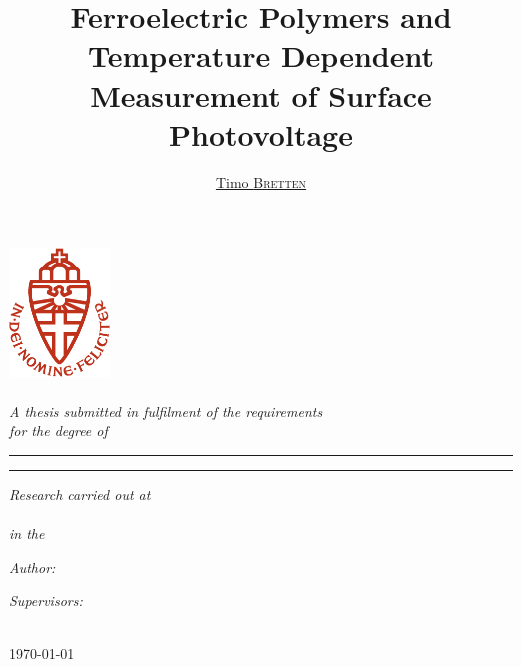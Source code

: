 \begin{titlepage}

\title{Ferroelectric Polymers and Temperature Dependent Measurement of Surface Photovoltage}
\author{\href{mailto:t.bretten@gmail.com}{Timo \textsc{Bretten}}}


\begin{center}
\includegraphics[width=0.2\textwidth]{../figs/logos/LogoRed}~\\[1cm]
\textsc{\LARGE \univname}\\[1.5cm]
\textit{\large A thesis submitted in fulfilment of the requirements\\ for the degree of \degreename}\\[0.5cm]

\hrule
\bigskip
{\huge \bfseries \ttitle \bigskip}
\hrule
\bigskip
\noindent
\textit{\large Research carried out at \\ \deptname{} \\ in the\\ \groupname \large }
\bigskip
\noindent

\begin{minipage}[t]{0.4\textwidth}
\begin{flushleft} \large
\emph{Author:}\\
\authorname
\end{flushleft}
\end{minipage}%
\begin{minipage}[t]{0.4\textwidth}
\begin{flushright} \large
\emph{Supervisors:} \\
\supname \\
\examname
\end{flushright}
\end{minipage}

\vfill

{\large \today}

\end{center}

\end{titlepage}